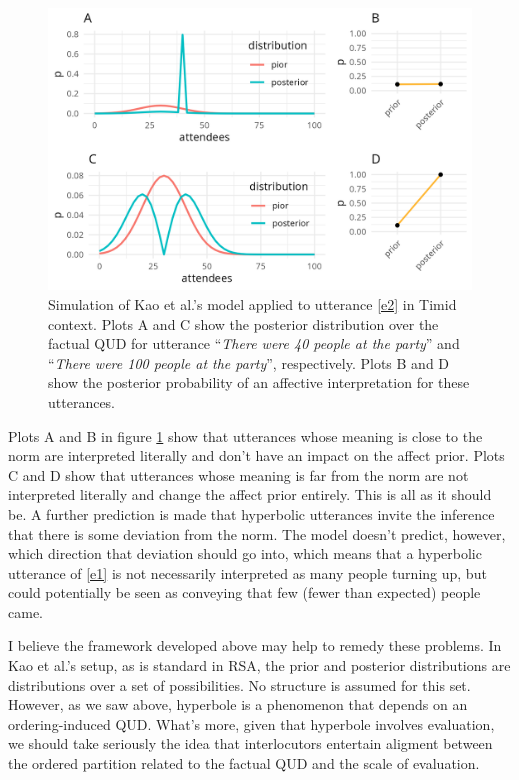 \documentclass[a4paper,12pt,twoside]{article}
\begin{document}
\begin{figure}[t]
\includegraphics[width=\textwidth]{simplekao.png}\caption{Simulation of Kao et al.'s model applied to utterance \ref{e2} in Timid context. Plots A and C show the posterior distribution over the factual QUD for utterance ``{\em There were 40 people at the party}'' and ``{\em There were 100 people at the party}'', respectively. Plots B and D show the posterior probability of an affective interpretation for these utterances.}   \label{kao}
\end{figure}

Plots A and B in figure \ref{kao} show that utterances whose meaning is close to the norm are interpreted literally and don't have an impact on the affect prior. Plots C and D show that utterances whose meaning is far from the norm are not interpreted literally and change the affect prior entirely. This is all as it should be. A further prediction is made that hyperbolic utterances invite the inference that there is some deviation from the norm. The model doesn't predict, however, which direction that deviation should go into, which means that a hyperbolic utterance of \ref{e1} is not necessarily interpreted as many people turning up, but could potentially be seen as conveying that few (fewer than expected) people came. 

I believe the framework developed above may help to remedy these problems. In Kao et al.'s setup, as is standard in RSA, the prior and posterior distributions are distributions over a set of possibilities. No structure is assumed for this set. However, as we saw above, hyperbole is a phenomenon that depends on an ordering-induced QUD. What's more, given that hyperbole involves evaluation, we should take seriously the idea that interlocutors entertain aligment between the ordered partition related to the factual QUD and the scale of evaluation.  
\end{document}
